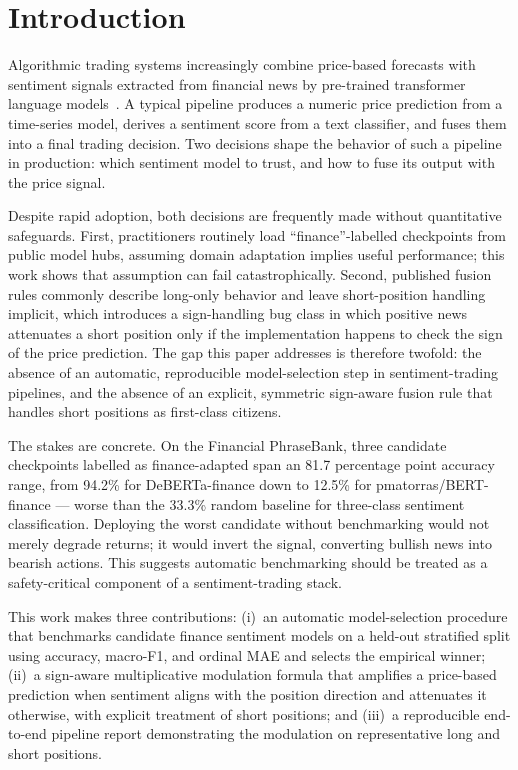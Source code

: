 \documentclass[conference]{IEEEtran}
\begin{document}
\section{Introduction}

Algorithmic trading systems increasingly combine price-based forecasts with
sentiment signals extracted from financial news by pre-trained transformer
language models~\cite{hu2018listening,xing2019sentiment}. A typical pipeline
produces a numeric price prediction from a time-series model, derives a
sentiment score from a text classifier, and fuses them into a final trading
decision. Two decisions shape the behavior of such a pipeline in production:
which sentiment model to trust, and how to fuse its output with the price
signal.

Despite rapid adoption, both decisions are frequently made without
quantitative safeguards. First, practitioners routinely load
``finance''-labelled checkpoints from public model hubs, assuming domain
adaptation implies useful performance; this work shows that assumption can
fail catastrophically. Second, published fusion rules commonly describe
long-only behavior and leave short-position handling implicit, which
introduces a sign-handling bug class in which positive news attenuates a
short position only if the implementation happens to check the sign of the
price prediction. The gap this paper addresses is therefore twofold: the
absence of an automatic, reproducible model-selection step in
sentiment-trading pipelines, and the absence of an explicit, symmetric
sign-aware fusion rule that handles short positions as first-class citizens.

The stakes are concrete. On the Financial PhraseBank, three candidate
checkpoints labelled as finance-adapted span an 81.7 percentage point
accuracy range, from 94.2\% for DeBERTa-finance down to 12.5\% for
pmatorras/BERT-finance --- worse than the 33.3\% random baseline for
three-class sentiment classification. Deploying the worst candidate without
benchmarking would not merely degrade returns; it would invert the signal,
converting bullish news into bearish actions. This suggests automatic
benchmarking should be treated as a safety-critical component of a
sentiment-trading stack.

This work makes three contributions: (i)~an automatic model-selection
procedure that benchmarks candidate finance sentiment models on a held-out
stratified split using accuracy, macro-F1, and ordinal MAE and selects the
empirical winner; (ii)~a sign-aware multiplicative modulation formula that
amplifies a price-based prediction when sentiment aligns with the position
direction and attenuates it otherwise, with explicit treatment of short
positions; and (iii)~a reproducible end-to-end pipeline report demonstrating
the modulation on representative long and short positions.
\end{document}
